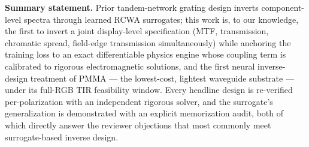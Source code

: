 \bigskip
\noindent\textbf{Summary statement.}
Prior tandem-network grating design inverts component-level spectra through
learned RCWA surrogates; this work is, to our knowledge, the first to invert
a joint display-level specification (MTF, transmission, chromatic spread,
field-edge transmission simultaneously) while anchoring the training loss to
an exact differentiable physics engine whose coupling term is calibrated to
rigorous electromagnetic solutions, and the first neural inverse-design
treatment of PMMA --- the lowest-cost, lightest waveguide substrate --- under
its full-RGB TIR feasibility window. Every headline design is re-verified
per-polarization with an independent rigorous solver, and the surrogate's
generalization is demonstrated with an explicit memorization audit, both of
which directly answer the reviewer objections that most commonly meet
surrogate-based inverse design.


